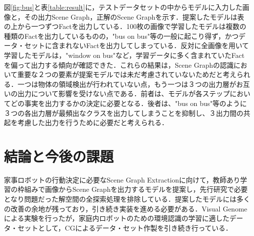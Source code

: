 図\ref{fig:bus}と表\ref{table:result}に，テストデータセットの中からモデルに入力した画像と，その出力Scene Graph，正解のScene Graphを示す．提案したモデルは表の上から一つずつFactを出力している．100枚の画像で学習したモデルは複数の種類のFactを出力しているものの，"bus on bus"等の一般に起こり得ず，かつデータ・セットに含まれないFactを出力してしまっている．反対に全画像を用いて学習したモデルは，"window on bus"など，学習データに多く含まれていたFactを偏って出力する傾向が確認できた．これらの結果は，Scene Graphの認識において重要な２つの要素が提案モデルでは未だ考慮されていないためだと考えられる．一つは物体の領域検出が行われていない点，もう一つは３つの出力層がお互いの出力について影響を受けない点である．前者は、モデルが各ステップにおいてどの事実を出力するかの決定に必要となる．後者は、"bus on bus"等のように３つの各出力層が最頻出なクラスを出力してしまうことを抑制し、３出力間の共起を考慮した出力を行うために必要だと考えられる．
\section{結論と今後の課題}
家事ロボットの行動決定に必要なScene Graph Extractionに向けて，教師あり学習の枠組みで画像からScene Graphを出力するモデルを提案し，先行研究で必要となり問題だった解空間の全探索処理を排除している．提案したモデルには多くの改善の余地が残っており，引き続き実装を進める必要がある．Visual Genomeによる実験を行ったが，家庭内ロボットのための環境認識の学習に適したデータ・セットとして，CGによるデータ・セット作製を引き続き行っている．



